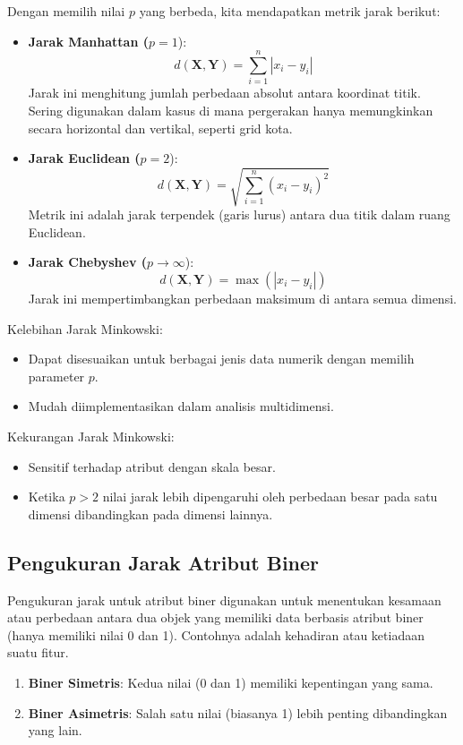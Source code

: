 \documentclass[
  oneside]{book}
\begin{document}
Dengan memilih nilai \(p\) yang berbeda, kita mendapatkan metrik jarak berikut:

\begin{itemize}
\item
  \textbf{Jarak Manhattan (}\(p = 1\)): \[
     d(\mathbf{X}, \mathbf{Y}) = \sum_{i=1}^n |x_i - y_i|
     \] Jarak ini menghitung jumlah perbedaan absolut antara koordinat titik. Sering digunakan dalam kasus di mana pergerakan hanya memungkinkan secara horizontal dan vertikal, seperti grid kota.
\item
  \textbf{Jarak Euclidean (}\(p = 2\)): \[
     d(\mathbf{X}, \mathbf{Y}) = \sqrt{\sum_{i=1}^n (x_i - y_i)^2}
     \] Metrik ini adalah jarak terpendek (garis lurus) antara dua titik dalam ruang Euclidean.
\item
  \textbf{Jarak Chebyshev (}\(p \to \infty\)): \[
     d(\mathbf{X}, \mathbf{Y}) = \max(|x_i - y_i|)
     \] Jarak ini mempertimbangkan perbedaan maksimum di antara semua dimensi.
\end{itemize}

Kelebihan Jarak Minkowski:

\begin{itemize}
\item
  Dapat disesuaikan untuk berbagai jenis data numerik dengan memilih parameter \(p\).
\item
  Mudah diimplementasikan dalam analisis multidimensi.
\end{itemize}

Kekurangan Jarak Minkowski:

\begin{itemize}
\item
  Sensitif terhadap atribut dengan skala besar.
\item
  Ketika \(p > 2\) nilai jarak lebih dipengaruhi oleh perbedaan besar pada satu dimensi dibandingkan pada dimensi lainnya.
\end{itemize}

\subsection{Pengukuran Jarak Atribut Biner}\label{pengukuran-jarak-atribut-biner}

Pengukuran jarak untuk atribut biner digunakan untuk menentukan kesamaan atau perbedaan antara dua objek yang memiliki data berbasis atribut biner (hanya memiliki nilai 0 dan 1). Contohnya adalah kehadiran atau ketiadaan suatu fitur.

\begin{enumerate}
\def\labelenumi{\arabic{enumi}.}
\item
  \textbf{Biner Simetris}: Kedua nilai (0 dan 1) memiliki kepentingan yang sama.
\item
  \textbf{Biner Asimetris}: Salah satu nilai (biasanya 1) lebih penting dibandingkan yang lain.
\end{enumerate}
\end{document}
